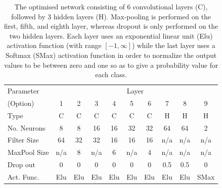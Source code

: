 \documentclass[%
showpacs,
 amsmath,amssymb,
 aps,
 twocolumn,
 prl,
 reprint,
floatfix,
]{revtex4-1}
\newcommand{\chris}[1]{\textbf{\textcolor{green}{CHRIS: #1}}}
\newcommand{\hunter}[1]{\textbf{\textcolor{blue}{HUNTER: #1}}}
\begin{document}
% 
%

\begin{table}[]
\begin{tabular}{lccccccccc}
\hline
\hline
Parameter & \multicolumn{9}{c}{Layer}\\
\cline{2-10}
(Option) & 1 & 2 & 3 & 4 & 5 & 6 & 7 & 8 & 9 \\
\hline
Type & C & C & C & C & C & C & H & H & H \\
No. Neurons  & 8  & 8  & 16 & 16 & 32 & 32 & 64  & 64  & 2  \\
Filter Size  & 64 & 32 & 32 & 16 & 16  & 16  & n/a & n/a & n/a  \\
MaxPool Size & n/a & 8 & n/a & 6 & n/a & 4 & n/a & n/a & n/a \\
Drop out  & 0 & 0 & 0 & 0 & 0 & 0 & 0.5 & 0.5 & 0 \\
Act. Func. & Elu & Elu & Elu & Elu & Elu & Elu & Elu & Elu & SMax \\
\hline
\end{tabular}
\caption{The optimised network consisting of 6 convolutional layers (C),
followed by 3 hidden layers (H). Max-pooling is performed on the first, fifth,
and eighth layer, whereas dropout is only performed on the two hidden layers.
Each layer uses an exponential linear unit (Elu) activation function (with
range $[-1,\infty]$) while the last layer uses a Softmax (SMax) activation
function in order to normalize the output values to be between zero and one so
as to give a probability value for each class.\label{table:network}}
\end{table}
\end{document}
